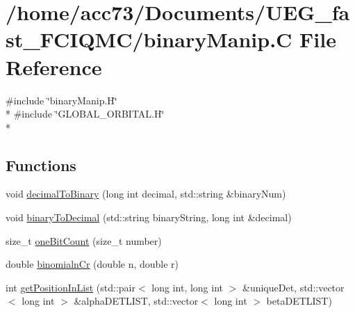 \hypertarget{binaryManip_8C}{\section{/home/acc73/\-Documents/\-U\-E\-G\-\_\-fast\-\_\-\-F\-C\-I\-Q\-M\-C/binary\-Manip.C File Reference}
\label{binaryManip_8C}
}
{\ttfamily \#include \char`\"{}binary\-Manip.\-H\char`\"{}}\\*
{\ttfamily \#include \char`\"{}G\-L\-O\-B\-A\-L\-\_\-\-O\-R\-B\-I\-T\-A\-L.\-H\char`\"{}}\\*
\subsection*{Functions}
\begin{DoxyCompactItemize}
\item 
void \hyperlink{binaryManip_8C_ab7bfd801bf91093fcc656f7c7c482ae0}{decimal\-To\-Binary} (long int decimal, std\-::string \&binary\-Num)
\item 
void \hyperlink{binaryManip_8C_a78dd21234e5e81fa1750de27a5c388d0}{binary\-To\-Decimal} (std\-::string binary\-String, long int \&decimal)
\item 
size\-\_\-t \hyperlink{binaryManip_8C_a447dd415c2b5e132e3acd34f6019bfa6}{one\-Bit\-Count} (size\-\_\-t number)
\item 
double \hyperlink{binaryManip_8C_ace6c6b3196184abca5dd71b8f81861b6}{binomialn\-Cr} (double n, double r)
\item 
int \hyperlink{binaryManip_8C_ade4b6fc3c24b6debe99cd0d01409dd69}{get\-Position\-In\-List} (std\-::pair$<$ long int, long int $>$ \&unique\-Det, std\-::vector$<$ long int $>$ \&alpha\-D\-E\-T\-L\-I\-S\-T, std\-::vector$<$ long int $>$ beta\-D\-E\-T\-L\-I\-S\-T)
\end{DoxyCompactItemize}


